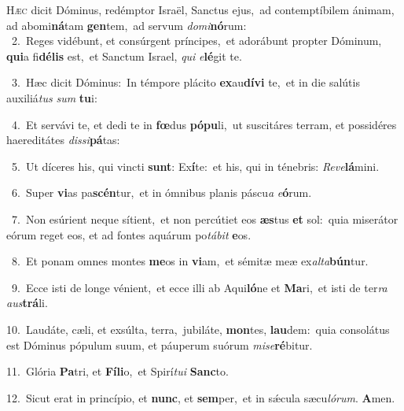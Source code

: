 \lettrine{\initial\textcolor{\initialcolor}{H}}{æc} dicit Dóminus, redémptor Israël, Sanctus ejus,~\dagger ad contemptíbilem ánimam, ad abomi\-\textbf{ná}\-tam \textbf{gen}\-tem,~\star ad servum \textit{do}\-\textit{mi}\textbf{nó}rum:\\
{\numbfont\textcolor{\numbcolor}{~2.}}~Reges vidébunt, et consúrgent príncipes,~\dagger et adorábunt propter Dóminum, \textbf{qui}\-a fi\-\textbf{dé}\-\textbf{lis} est,~\star et Sanctum Israel, \textit{qui} \textit{e}\-\textbf{lé}git te.\par
{\numbfont\textcolor{\numbcolor}{~3.}}~Hæc dicit Dóminus:~\dagger In témpore plácito \textbf{ex}\-au\-\textbf{dí}\-\textbf{vi} te,~\star et in die salútis auxiliá\textit{tus} \textit{sum} \textbf{tu}\-i:\par
{\numbfont\textcolor{\numbcolor}{~4.}}~Et servávi te, et dedi te in \textbf{fœ}\-dus \textbf{pó}\-\textbf{pu}li,~\star ut suscitáres terram, et possidéres haereditátes \textit{dis}\-\textit{si}\textbf{pá}tas:\par
{\numbfont\textcolor{\numbcolor}{~5.}}~Ut díceres his, qui vincti \textbf{sunt}\-: Ex\-\textbf{í}\-te:~\star et his, qui in ténebris: \textit{Re}\-\textit{ve}\textbf{lá}mini.\par
{\numbfont\textcolor{\numbcolor}{~6.}}~Super \textbf{vi}\-as pa\-\textbf{scén}\-tur,~\star et in ómnibus planis páscu\textit{a} \textit{e}\-\textbf{ó}rum.\par
{\numbfont\textcolor{\numbcolor}{~7.}}~Non esúrient neque sítient,~\dagger et non percútiet eos \textbf{æs}\-tus \textbf{et} sol:~\star quia miserátor eórum reget eos, et ad fontes aquárum po\-\textit{tá}\-\textit{bit} \textbf{e}\-os.\par
{\numbfont\textcolor{\numbcolor}{~8.}}~Et ponam omnes montes \textbf{me}\-os in \textbf{vi}\-am,~\star et sémitæ meæ ex\-\textit{al}\-\textit{ta}\textbf{bún}tur.\par
{\numbfont\textcolor{\numbcolor}{~9.}}~Ecce isti de longe vénient,~\dagger et ecce illi ab Aqui\-\textbf{ló}\-ne et \textbf{Ma}\-ri,~\star et isti de ter\textit{ra} \textit{aus}\-\textbf{trá}li.\par
{\numbfont\textcolor{\numbcolor}{10.}}~Laudáte, cæli, et exsúlta, terra,~\dagger jubiláte, \textbf{mon}\-tes, \textbf{lau}\-dem:~\star quia consolátus est Dóminus pópulum suum, et páuperum suórum \textit{mi}\-\textit{se}\textbf{ré}bitur.\par
{\numbfont\textcolor{\numbcolor}{11.}}~Glória \textbf{Pa}\-tri, et \textbf{Fí}\-\textbf{li}o,~\star et Spirí\-\textit{tu}\-\textit{i} \textbf{Sanc}\-to.\par
{\numbfont\textcolor{\numbcolor}{12.}}~Sicut erat in princípio, et \textbf{nunc}\-, et \textbf{sem}\-per,~\star et in sǽcula sæcu\-\textit{ló}\-\textit{rum}. \textbf{A}\-men.\par
